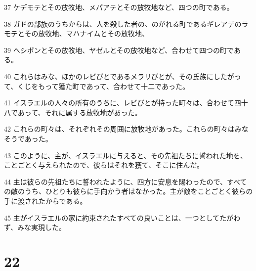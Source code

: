 \par 37 ケデモテとその放牧地、メパアテとその放牧地など、四つの町である。
\par 38 ガドの部族のうちからは、人を殺した者の、のがれる町であるギレアデのラモテとその放牧地、マハナイムとその放牧地、
\par 39 ヘシボンとその放牧地、ヤゼルとその放牧地など、合わせて四つの町である。
\par 40 これらはみな、ほかのレビびとであるメラリびとが、その氏族にしたがって、くじをもって獲た町であって、合わせて十二であった。
\par 41 イスラエルの人々の所有のうちに、レビびとが持った町々は、合わせて四十八であって、それに属する放牧地があった。
\par 42 これらの町々は、それぞれその周囲に放牧地があった。これらの町々はみなそうであった。
\par 43 このように、主が、イスラエルに与えると、その先祖たちに誓われた地を、ことごとく与えられたので、彼らはそれを獲て、そこに住んだ。
\par 44 主は彼らの先祖たちに誓われたように、四方に安息を賜わったので、すべての敵のうち、ひとりも彼らに手向かう者はなかった。主が敵をことごとく彼らの手に渡されたからである。
\par 45 主がイスラエルの家に約束されたすべての良いことは、一つとしてたがわず、みな実現した。

\chapter{22}

